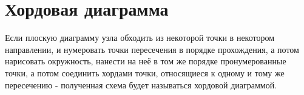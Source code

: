 \section{Хордовая диаграмма}

Если плоскую диаграмму узла обходить из некоторой точки в некотором направлении, и нумеровать точки пересечения в порядке прохождения, а потом нарисовать окружность, нанести на неё в том же порядке пронумерованные точки, а потом соединить хордами точки, относящиеся к одному и тому же пересечению - полученная схема будет называться хордовой диаграммой.